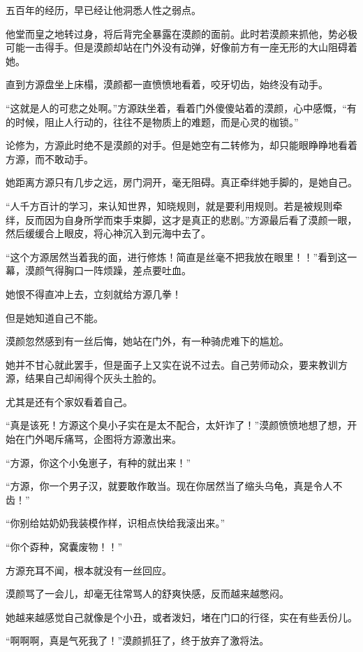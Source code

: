 \begin{this_body}
五百年的经历，早已经让他洞悉人性之弱点。

他堂而皇之地转过身，将后背完全暴露在漠颜的面前。此时若漠颜来抓他，势必极可能一击得手。但是漠颜却站在门外没有动弹，好像前方有一座无形的大山阻碍着她。

直到方源盘坐上床榻，漠颜都一直愤愤地看着，咬牙切齿，始终没有动手。

“这就是人的可悲之处啊。”方源趺坐着，看着门外傻傻站着的漠颜，心中感慨，“有的时候，阻止人行动的，往往不是物质上的难题，而是心灵的枷锁。”

论修为，方源此时绝不是漠颜的对手。但是她空有二转修为，却只能眼睁睁地看着方源，而不敢动手。

她距离方源只有几步之远，房门洞开，毫无阻碍。真正牵绊她手脚的，是她自己。

“人千方百计的学习，来认知世界，知晓规则，就是要利用规则。若是被规则牵绊，反而因为自身所学而束手束脚，这才是真正的悲剧。”方源最后看了漠颜一眼，然后缓缓合上眼皮，将心神沉入到元海中去了。

“这个方源居然当着我的面，进行修炼！简直是丝毫不把我放在眼里！！”看到这一幕，漠颜气得胸口一阵烦躁，差点要吐血。

她恨不得直冲上去，立刻就给方源几拳！

但是她知道自己不能。

漠颜忽然感到有一丝后悔，她站在门外，有一种骑虎难下的尴尬。

她并不甘心就此罢手，但是面子上又实在说不过去。自己劳师动众，要来教训方源，结果自己却闹得个灰头土脸的。

尤其是还有个家奴看着自己。

“真是该死！方源这个臭小子实在是太不配合，太奸诈了！”漠颜愤愤地想了想，开始在门外喝斥痛骂，企图将方源激出来。

“方源，你这个小兔崽子，有种的就出来！”

“方源，你一个男子汉，就要敢作敢当。现在你居然当了缩头乌龟，真是令人不齿！”

“你别给姑奶奶我装模作样，识相点快给我滚出来。”

“你个孬种，窝囊废物！！”

方源充耳不闻，根本就没有一丝回应。

漠颜骂了一会儿，却毫无往常骂人的舒爽快感，反而越来越憋闷。

她越来越感觉自己就像是个小丑，或者泼妇，堵在门口的行径，实在有些丢份儿。

“啊啊啊，真是气死我了！”漠颜抓狂了，终于放弃了激将法。


\end{this_body}
